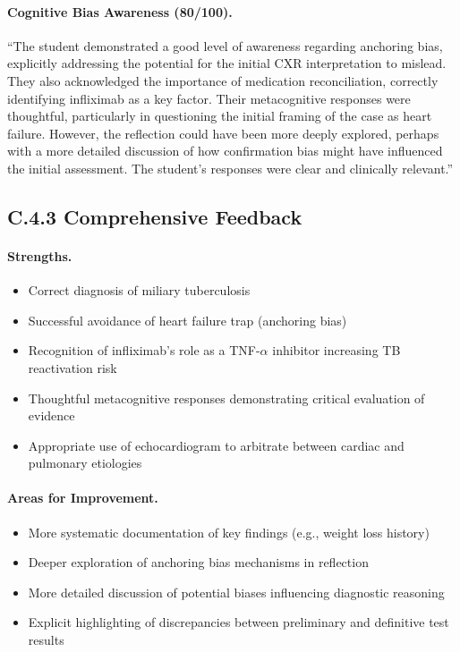 \paragraph{Cognitive Bias Awareness (80/100).}
``The student demonstrated a good level of awareness regarding anchoring bias, explicitly addressing the potential for the initial CXR interpretation to mislead. They also acknowledged the importance of medication reconciliation, correctly identifying infliximab as a key factor. Their metacognitive responses were thoughtful, particularly in questioning the initial framing of the case as heart failure. However, the reflection could have been more deeply explored, perhaps with a more detailed discussion of how confirmation bias might have influenced the initial assessment. The student's responses were clear and clinically relevant.''

\subsection*{C.4.3 \quad Comprehensive Feedback}

\paragraph{Strengths.}
\begin{itemize}
  \item Correct diagnosis of miliary tuberculosis
  \item Successful avoidance of heart failure trap (anchoring bias)
  \item Recognition of infliximab's role as a TNF-$\alpha$ inhibitor increasing TB reactivation risk
  \item Thoughtful metacognitive responses demonstrating critical evaluation of evidence
  \item Appropriate use of echocardiogram to arbitrate between cardiac and pulmonary etiologies
\end{itemize}

\paragraph{Areas for Improvement.}
\begin{itemize}
  \item More systematic documentation of key findings (e.g., weight loss history)
  \item Deeper exploration of anchoring bias mechanisms in reflection
  \item More detailed discussion of potential biases influencing diagnostic reasoning
  \item Explicit highlighting of discrepancies between preliminary and definitive test results
\end{itemize}

